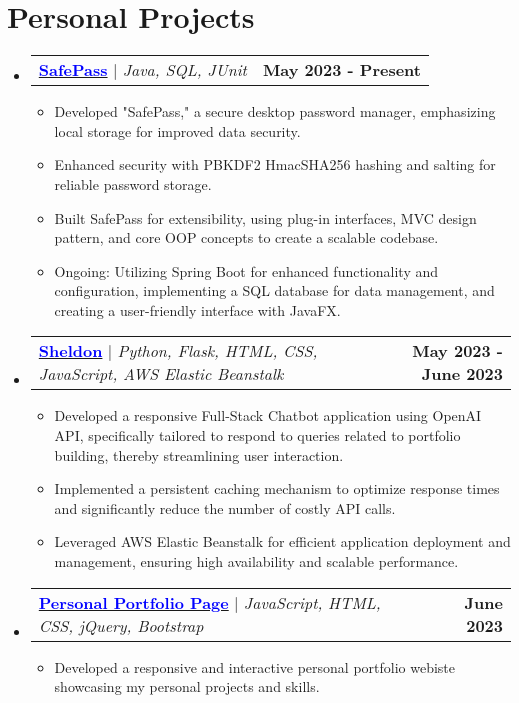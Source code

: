 \documentclass[letterpaper,11pt]{article}
\makeatletter
\newcommand{\resumeItem}[1]{
  \item\small{
    {#1 \vspace{-2pt}}
  }
}
\newcommand{\resumeProjectHeading}[2]{
    \item
    \begin{tabular*}{1.001\textwidth}{l@{\extracolsep{\fill}}r}
      \small#1 & \textbf{\small #2}\\
    \end{tabular*}\vspace{-7pt}
}
\newcommand{\resumeSubHeadingListStart}{\begin{itemize}[leftmargin=0.0in, label={}]}
\newcommand{\resumeSubHeadingListEnd}{\end{itemize}}
\newcommand{\resumeItemListStart}{\begin{itemize}}
\newcommand{\resumeItemListEnd}{\end{itemize}\vspace{-5pt}}
\makeatother
\begin{document}
\section{Personal Projects}
    \vspace{-5pt}
    \resumeSubHeadingListStart
      \resumeProjectHeading
          {\href{https://github.com/ShevinuM/SafePass}{\textcolor{blue}{\textbf{SafePass}}} $|$ \emph{Java, SQL, JUnit}}{May 2023 - Present}
          \resumeItemListStart
            \resumeItem{Developed "SafePass," a secure desktop password manager, emphasizing local storage for improved data security.}
            \resumeItem{Enhanced security with PBKDF2 HmacSHA256 hashing and salting for reliable password storage.}
            \resumeItem{Built SafePass for extensibility, using plug-in interfaces, MVC design pattern, and core OOP concepts to create a scalable codebase.}
            \resumeItem{Ongoing: Utilizing Spring Boot for enhanced functionality and configuration, implementing a SQL database for data management, and creating a user-friendly interface with JavaFX.}
          \resumeItemListEnd
          \vspace{-13pt}
      \resumeProjectHeading
          {\href{https://github.com/ShevinuM/Sheldon}{\textcolor{blue}{\textbf{Sheldon}}} $|$ \emph{Python, Flask, HTML, CSS, JavaScript, AWS Elastic Beanstalk}}{May 2023 - June 2023}
          \resumeItemListStart
            \resumeItem{Developed a responsive Full-Stack Chatbot application using OpenAI API, specifically tailored to respond to queries related to portfolio building, thereby streamlining user interaction.}
            \resumeItem{Implemented a persistent caching mechanism to optimize response times and significantly reduce the number of costly API calls.}
            \resumeItem{Leveraged AWS Elastic Beanstalk for efficient application deployment and management, ensuring high availability and scalable performance.}
          \resumeItemListEnd 
          \vspace{-13pt}
          \resumeProjectHeading
          {\href{http://shevinum.dev}{\textcolor{blue}{\textbf{Personal Portfolio Page}}} $|$ \emph{JavaScript, HTML, CSS, jQuery, Bootstrap}}{June 2023}
          \resumeItemListStart
            \resumeItem{Developed a responsive and interactive personal portfolio webiste showcasing my personal projects and skills.}
          \resumeItemListEnd 
    \resumeSubHeadingListEnd
\vspace{-15pt}
\end{document}
